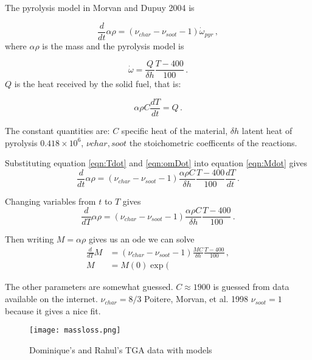 \documentclass[reqno]{amsart}
\begin{document}
The pyrolysis model in Morvan and Dupuy 2004 is

\begin{equation}
  \frac{d}{dt}{\alpha \rho}=(\nu_{char}-\nu_{soot}-1)\dot{\omega}_{pyr}\,,
\label{eqn:Mdot}
\end{equation}
where $\alpha\rho$ is the mass and the pyrolysis model is 

\begin{equation}
  \dot{\omega}=\frac{Q}{\delta h} \frac{T-400}{100}\,.
\label{eqn:omdot}
\end{equation}
$Q$ is the heat received by the solid fuel, that is:

\begin{equation}
  \alpha \rho C \frac{dT}{dt}=Q\,.
\label{eqn:Tdot}
\end{equation}

The constant quantities are: $C$ specific heat of the material, $\delta h$ latent heat of pyrolysis $0.418\times 10^{6}$, $\nu{char,soot}$ the stoichometric coefficents of the reactions. 

Substituting equation \eqref{eqn:Tdot} and \eqref{eqn:omDot} into equation \eqref{eqn:Mdot} gives
\begin{equation}
  \frac{d}{dt}{\alpha \rho}=(\nu_{char}-\nu_{soot}-1)  \frac{\alpha \rho C}{\delta h}  \frac{T-400}{100} \frac{dT}{dt}\,.
\label{eqn:step1}
\end{equation}

Changing variables from $t$ to $T$ gives
\begin{equation}
  \frac{d}{dT}{\alpha \rho}=(\nu_{char}-\nu_{soot}-1)  \frac{\alpha \rho C}{\delta h}  \frac{T-400}{100}\,.
\label{eqn:step2}
\end{equation}

Then writing $M=\alpha \rho$ gives us an ode we can solve
\begin{align}
  \frac{d}{dT}{M}&=(\nu_{char}-\nu_{soot}-1)  \frac{M C}{\delta h}  \frac{T-400}{100}\,,\\
  M&=M(0) \exp(
\label{eqn:step2}
\end{align}

The other parameters are somewhat guessed. 
$C\approx 1900$ is guessed from data available on the internet. 
$\nu_{char}=8/3$ Poitere, Morvan, et al. 1998 
$\nu_{soot}=1$ because it gives a nice fit. 

\begin{figure}
\centering
  \texttt{[image: massloss.png]}
\caption{Dominique's and Rahul's TGA data with models}
\end{figure}
\end{document}
